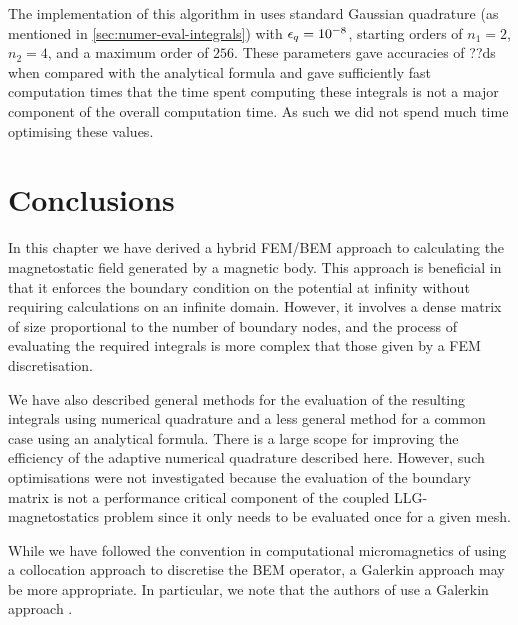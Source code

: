 The implementation of this algorithm in \oomph uses standard Gaussian quadrature (as mentioned in \cref{sec:numer-eval-integrals}) with $\epsilon_q = 10^{-8}$, starting orders of $n_1=2$, $n_2=4$, and a maximum order of $256$.
These parameters gave accuracies of ??ds when compared with the analytical formula and gave sufficiently fast computation times that the time spent computing these integrals is not a major component of the overall computation time.
As such we did not spend much time optimising these values.


\section{Conclusions}

In this chapter we have derived a hybrid FEM/BEM approach to calculating the magnetostatic field generated by a magnetic body.
This approach is beneficial in that it enforces the boundary condition on the potential at infinity without requiring calculations on an infinite domain.
However, it involves a dense matrix of size proportional to the number of boundary nodes, and the process of evaluating the required integrals is more complex that those given by a FEM discretisation.

We have also described general methods for the evaluation of the resulting integrals using numerical quadrature and a less general method for a common case using an analytical formula.
There is a large scope for improving the efficiency of the adaptive numerical quadrature described here.
However, such optimisations were not investigated because the evaluation of the boundary matrix is not a performance critical component of the coupled LLG-magnetostatics problem since it only needs to be evaluated once for a given mesh.

While we have followed the convention in computational micromagnetics of using a collocation approach to discretise the BEM operator, a Galerkin approach may be more appropriate.
In particular, we note that the authors of \hlib use a Galerkin approach \cite{Borm2003}.

